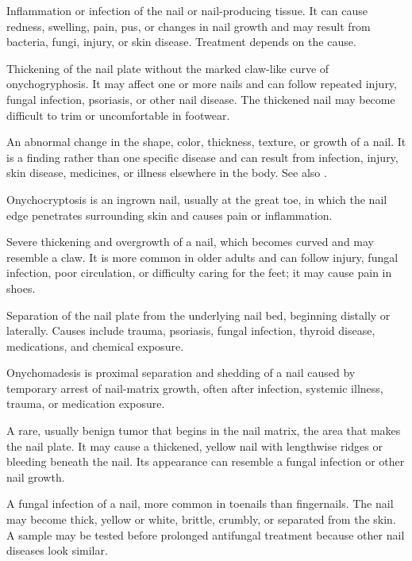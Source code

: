  Inflammation or infection of the nail or nail-producing tissue. It can cause redness, swelling, pain, pus, or changes in nail growth and may result from bacteria, fungi, injury, or skin disease. Treatment depends on the cause.

 Thickening of the nail plate without the marked
  claw-like curve of onychogryphosis. It may affect one or more nails
  and can follow repeated injury, fungal infection, psoriasis, or other
  nail disease. The thickened nail may become difficult to trim or
  uncomfortable in footwear.

 An abnormal change in the shape, color,
  thickness, texture, or growth of a nail. It is a finding rather than
  one specific disease and can result from infection, injury, skin
  disease, medicines, or illness elsewhere in the body. See also
  .

 Onychocryptosis is an ingrown nail, usually at the great toe, in which the nail edge penetrates surrounding skin and causes pain or inflammation.

 Severe thickening and overgrowth of a nail, which becomes curved and may resemble a claw. It is more common in older adults and can follow injury, fungal infection, poor circulation, or difficulty caring for the feet; it may cause pain in shoes.

 Separation of the nail plate from the underlying nail bed, beginning distally or
laterally. Causes include trauma, psoriasis, fungal infection, thyroid disease,
medications, and chemical exposure.

 Onychomadesis is proximal separation and shedding of a nail caused by temporary arrest of nail-matrix growth, often after infection, systemic illness, trauma, or medication exposure.

 A rare, usually benign tumor that begins in
  the nail matrix, the area that makes the nail plate. It may cause a
  thickened, yellow nail with lengthwise ridges or bleeding beneath the
  nail. Its appearance can resemble a fungal infection or other nail
  growth.

 A fungal infection of a nail, more common in toenails than fingernails. The nail may become thick, yellow or white, brittle, crumbly, or separated from the skin. A sample may be tested before prolonged antifungal treatment because other nail diseases look similar.

